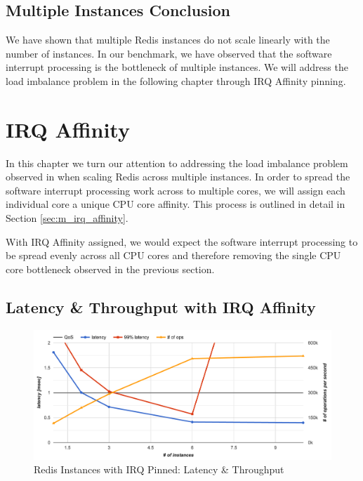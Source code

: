 \subsection{Multiple Instances Conclusion}
We have shown that multiple Redis instances do not scale linearly with the number of instances. In our benchmark, we have observed that the software interrupt processing is the bottleneck of multiple instances. We will address the load imbalance problem in the following chapter through IRQ Affinity pinning.

\section{IRQ Affinity}
In this chapter we turn our attention to addressing the load imbalance problem observed in when scaling Redis across multiple instances. In order to spread the software interrupt processing work across to multiple cores, we will assign each individual core a unique CPU core affinity. This process is outlined in detail in Section \ref{sec:m_irq_affinity}.

With IRQ Affinity assigned, we would expect the software interrupt processing to be spread evenly across all CPU cores and therefore removing the single CPU core bottleneck observed in the previous section.

\subsection{Latency \& Throughput with IRQ Affinity}
\begin{figure}[h]
    \includegraphics[width=\textwidth]{./res2/r_irq_latency.png}
    \caption{Redis Instances with IRQ Pinned: Latency \& Throughput}
    \label{fig:r_irq_latency}
\end{figure}


